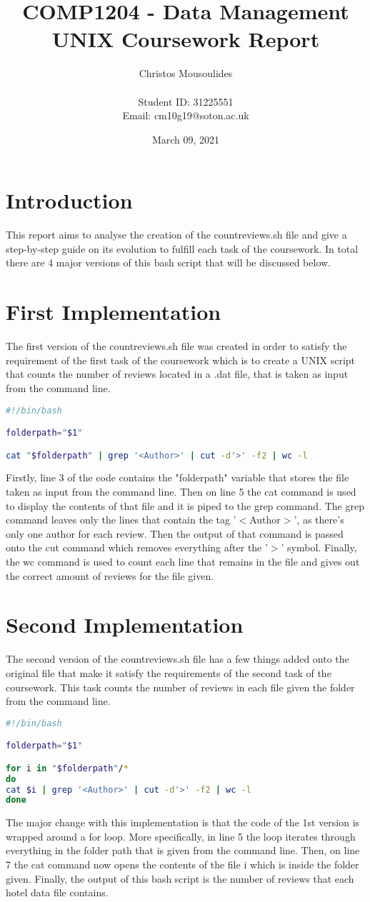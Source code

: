 \documentclass{report}
\title{\Huge COMP1204 - Data Management \\
        UNIX Coursework Report}
\author{\LARGE Christos Mousoulides \\ \\
        Student ID: 31225551 \\
        Email: cm10g19@soton.ac.uk}
\date{March 09, 2021}
\begin{document}
\maketitle

\section{Introduction}
This report aims to analyse the creation of the countreviews.sh file and give a step-by-step guide on its evolution to fulfill each task of the coursework. In total there are 4 major versions of this bash script that will be discussed below.

\section{First Implementation}
The first version of the countreviews.sh file was created in order to satisfy the requirement of the first task of the coursework which is to create a UNIX script that counts the number of reviews located in a .dat file, that is taken as input from the command line.
\begin{lstlisting}[language=bash]
#!/bin/bash

folderpath="$1"

cat "$folderpath" | grep '<Author>' | cut -d'>' -f2 | wc -l
\end{lstlisting}
Firstly, line 3 of the code contains the "folderpath" variable that stores the file taken as input from the command line. Then on line 5 the cat command is used to display the contents of that file and it is piped to the grep command. The grep command leaves only the lines that contain the tag '$<$Author$>$', as there's only one author for each review. Then the output of that command is passed onto the cut command which removes everything after the '$>$' symbol. Finally, the wc command is used to count each line that remains in the file and gives out the correct amount of reviews for the file given.

\section{Second Implementation}
The second version of the countreviews.sh file has a few things added onto the original file that make it satisfy the requirements of the second task of the coursework. This task counts the number of reviews in each file given the folder from the command line.
\begin{lstlisting}[language=bash]
#!/bin/bash

folderpath="$1"

for i in "$folderpath"/*
do
cat $i | grep '<Author>' | cut -d'>' -f2 | wc -l
done
\end{lstlisting}
The major change with this implementation is that the code of the 1st version is wrapped around a for loop. More specifically, in line 5 the loop iterates through everything in the folder path that is given from the command line. Then, on line 7 the cat command now opens the contents of the file i which is inside the folder given. Finally, the output of this bash script is the number of reviews that each hotel data file contains.
\end{document}
